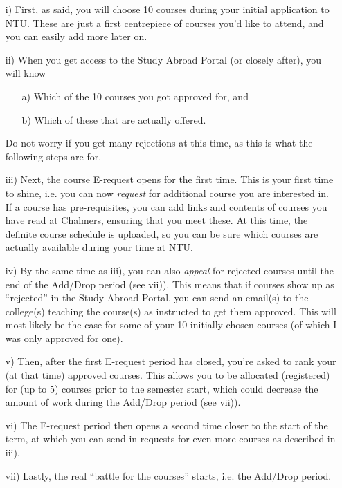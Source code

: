 \begin{enumerate}
    \item[i)] First, as said, you will choose 10 courses during your initial application to NTU. These are just a first centrepiece of courses you'd like to attend, and you can easily add more later on.
    \item[ii)] When you get access to the Study Abroad Portal (or closely after), you will know 
    \begin{enumerate}
        \item[a)] Which of the 10 courses you got approved for, and
        \item[b)] Which of these that are actually offered.
    \end{enumerate}
    Do not worry if you get many rejections at this time, as this is what the following steps are for.
    \item[iii)] Next, the course E-request opens for the first time. This is your first time to shine, i.e. you can now \textit{request} for additional course you are interested in. If a course has pre-requisites, you can add links and contents of courses you have read at Chalmers, ensuring that you meet these. At this time, the definite course schedule is uploaded, so you can be sure which courses are actually available during your time at NTU.
    \item[iv)] By the same time as iii), you can also \textit{appeal} for rejected courses until the end of the Add/Drop period (see vii)). This means that if courses show up as ``rejected'' in the Study Abroad Portal, you can send an email(s) to the college(s) teaching the course(s) as instructed to get them approved. This will most likely be the case for some of your 10 initially chosen courses (of which I was only approved for one).
    \item[v)] Then, after the first E-request period has closed, you're asked to rank your (at that time) approved courses. This allows you to be allocated (registered) for (up to 5) courses prior to the semester start, which could decrease the amount of work during the Add/Drop period (see vii)).
    \item[vi)] The E-request period then opens a second time closer to the start of the term, at which you can send in requests for even more courses as described in iii). 
    \item[vii)] Lastly, the real ``battle for the courses'' starts, i.e. the Add/Drop period.
\end{enumerate}
